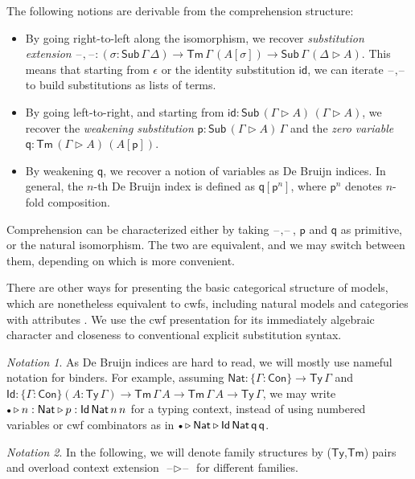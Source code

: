 \documentclass[12pt,a4paper,twoside,openany]{book}
\theoremstyle{remark}
\newtheorem{notation}{Notation}
\theoremstyle{definition}
\theoremstyle{theorem}
\newcommand{\ms}[1]{\mathsf{#1}}
\newcommand{\id}{\mathsf{id}}
\newcommand{\Con}{\mathsf{Con}}
\newcommand{\Sub}{\mathsf{Sub}}
\newcommand{\Tm}{\mathsf{Tm}}
\newcommand{\Ty}{\mathsf{Ty}}
\newcommand{\Id}{\mathsf{Id}}
\newcommand{\blank}{\mathord{\hspace{1pt}\text{--}\hspace{1pt}}}
\newcommand{\ext}{\triangleright}
\newcommand{\emptycon}{\scaleobj{.75}\bullet}
\newcommand{\p}{\mathsf{p}}
\newcommand{\q}{\mathsf{q}}
\newcommand{\Nat}{\ms{Nat}}
\begin{document}
The following notions are derivable from the comprehension structure:
\begin{itemize}
\item
  By going right-to-left along the isomorphism, we recover \emph{substitution
  extension} $\blank,\blank : (\sigma : \Sub\,\Gamma\,\Delta) \to
  \Tm\,\Gamma\,(A[\sigma]) \to \Sub\,\Gamma\,(\Delta\ext A)$. This means that
  starting from $\epsilon$ or the identity substitution $\id$, we can iterate
  $\blank,\blank$ to build substitutions as lists of terms.
\item
  By going left-to-right, and starting from $\id : \Sub\,(\Gamma\ext
  A)\,(\Gamma\ext A)$, we recover the \emph{weakening substitution} $\p :
  \Sub\,(\Gamma\ext A)\,\Gamma$ and the \emph{zero variable} $\q :
  \Tm\,(\Gamma\ext A)\,(A[\p])$.
\item
  By weakening $\q$, we recover a notion of variables as De Bruijn indices. In
  general, the $n$-th De Bruijn index is defined as $\q[\p^{n}]$, where $\p^{n}$
  denotes $n$-fold composition.
\end{itemize}

Comprehension can be characterized either by taking $\blank,\blank$, $\p$ and
$\q$ as primitive, or the natural isomorphism. The two are equivalent, and we
may switch between them, depending on which is more convenient.

There are other ways for presenting the basic categorical structure of models,
which are nonetheless equivalent to cwfs, including natural models
\cite{awodey18natural} and categories with attributes \cite{cartmellthesis}. We
use the cwf presentation for its immediately algebraic character and closeness
to conventional explicit substitution syntax.

\begin{notation}As De Bruijn indices are hard to read, we will mostly use
nameful notation for binders. For example, assuming $\Nat : \{\Gamma : \Con\}
\to \Ty\,\Gamma$ and $\Id : \{\Gamma : \Con\}(A : \Ty\,\Gamma) \to
\Tm\,\Gamma\,A \to \Tm\,\Gamma\,A \to \Ty\,\Gamma$, we may write $\emptycon \ext
n : \Nat \ext p : \Id\,\Nat\,n\,n$ for a typing context, instead of using
numbered variables or cwf combinators as in $\emptycon \ext \Nat \ext
\Id\,\Nat\,\q\,\q$.
\end{notation}

\begin{notation}
In the following, we will denote family structures by ($\Ty$,$\Tm$) pairs and overload context
extension $\blank\ext\blank$ for different families.
\end{notation}
\end{document}
